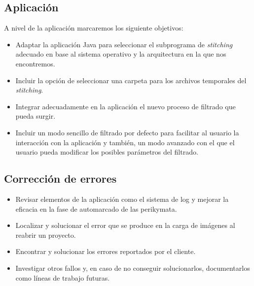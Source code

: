 \subsection{Aplicación}
A nivel de la aplicación marcaremos los siguiente objetivos:
\begin{itemize}
    \item Adaptar la aplicación Java para seleccionar el subprograma de \textit{stitching} adecuado en base al sistema operativo y la arquitectura en la que nos encontremos.
    \item Incluir la opción de seleccionar una carpeta para los archivos temporales del \textit{stitching}.
    \item Integrar adecuadamente en la aplicación el nuevo proceso de filtrado que pueda surgir.
    \item Incluir un modo sencillo de filtrado por defecto para facilitar al usuario la interacción con la aplicación y también, un modo avanzado con el que el usuario pueda modificar los posibles parámetros del filtrado.
\end{itemize}

\subsection{Corrección de errores}
\begin{itemize}
    \item Revisar elementos de la aplicación como el sistema de log y mejorar la eficacia en la fase de automarcado de las perikymata. 
    \item Localizar y solucionar el error que se produce en la carga de imágenes al reabrir un proyecto.
    \item Encontrar y solucionar los errores reportados por el cliente.
    \item Investigar otros fallos y, en caso de no conseguir solucionarlos, documentarlos como líneas de trabajo futuras.
\end{itemize}
